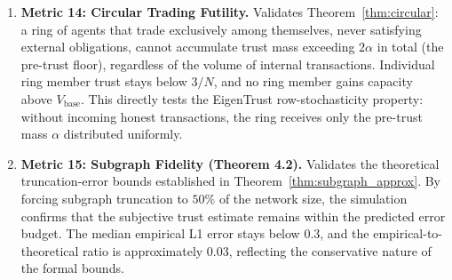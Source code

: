 \documentclass[11pt]{article}
\begin{document}
\begin{enumerate}
    \item \textbf{Metric 14: Circular Trading Futility.} Validates Theorem~\ref{thm:circular}: a ring of agents that trade exclusively among themselves, never satisfying external obligations, cannot accumulate trust mass exceeding $2\alpha$ in total (the pre-trust floor), regardless of the volume of internal transactions. Individual ring member trust stays below $3/N$, and no ring member gains capacity above $V_{\text{base}}$. This directly tests the EigenTrust row-stochasticity property: without incoming honest transactions, the ring receives only the pre-trust mass $\alpha$ distributed uniformly.
    \item \textbf{Metric 15: Subgraph Fidelity (Theorem 4.2).} Validates the theoretical truncation-error bounds established in Theorem~\ref{thm:subgraph_approx}. By forcing subgraph truncation to $50\%$ of the network size, the simulation confirms that the subjective trust estimate remains within the predicted error budget. The median empirical L1 error stays below $0.3$, and the empirical-to-theoretical ratio is approximately $0.03$, reflecting the conservative nature of the formal bounds.
\end{enumerate}
\end{document}
